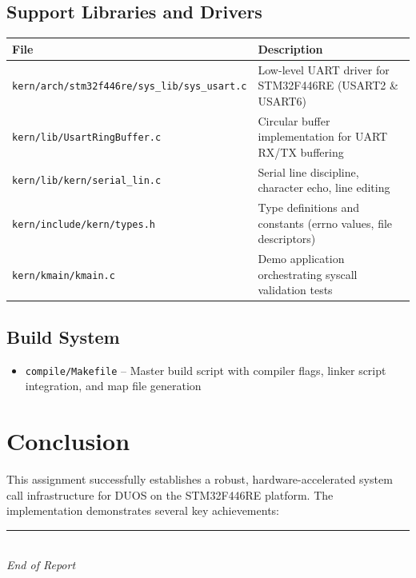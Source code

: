 \documentclass[11pt,a4paper]{article}
\newcommand{\file}[1]{\texttt{#1}}
\begin{document}
\subsection{Support Libraries and Drivers}
\begin{table}[h]
\centering
\begin{tabularx}{\linewidth}{@{}l X@{}}
\toprule
\textbf{File} & \textbf{Description} \\
\midrule
\file{kern/arch/stm32f446re/sys\_lib/sys\_usart.c} & Low-level UART driver for STM32F446RE (USART2 \& USART6) \\[0.2cm]
\file{kern/lib/UsartRingBuffer.c} & Circular buffer implementation for UART RX/TX buffering \\[0.2cm]
\file{kern/lib/kern/serial\_lin.c} & Serial line discipline, character echo, line editing \\[0.2cm]
\file{kern/include/kern/types.h} & Type definitions and constants (errno values, file descriptors) \\[0.2cm]
\file{kern/kmain/kmain.c} & Demo application orchestrating syscall validation tests \\
\bottomrule
\end{tabularx}
\end{table}

\subsection{Build System}
\begin{itemize}[leftmargin=1.5em]
  \item \file{compile/Makefile} -- Master build script with compiler flags, linker script integration, and map file generation
\end{itemize}

\section{Conclusion}

This assignment successfully establishes a robust, hardware-accelerated system call infrastructure for DUOS on the STM32F446RE platform. The implementation demonstrates several key achievements:


\vspace{1cm}
\begin{center}
\rule{0.8\linewidth}{0.5pt}\\[0.3cm]
\textit{End of Report}
\end{center}
\end{document}
